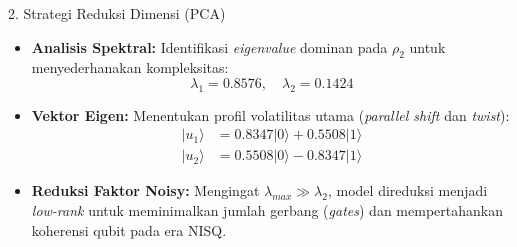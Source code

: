 \begin{frame}{2. Strategi Reduksi Dimensi (PCA)}
    \begin{itemize}
        \item \textbf{Analisis Spektral:} Identifikasi \textit{eigenvalue} dominan pada $\rho_2$ untuk menyederhanakan kompleksitas:
        \begin{equation}
            \lambda_1 = 0.8576, \quad \lambda_2 = 0.1424
        \end{equation}
        \item \textbf{Vektor Eigen:} Menentukan profil volatilitas utama (\textit{parallel shift} dan \textit{twist}):
        \begin{align}
            |u_1\rangle &= 0.8347|0\rangle + 0.5508|1\rangle \\
            |u_2\rangle &= 0.5508|0\rangle - 0.8347|1\rangle
        \end{align}
        \item \textbf{Reduksi Faktor Noisy:} Mengingat $\lambda_{max} \gg \lambda_2$, model direduksi menjadi \textit{low-rank} untuk meminimalkan jumlah gerbang (\textit{gates}) dan mempertahankan koherensi qubit pada era NISQ.
    \end{itemize}
\end{frame}

